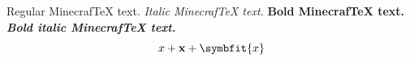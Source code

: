 \documentclass{article}
\begin{document}
Regular MinecrafTeX text.
\textit{Italic MinecrafTeX text.}
\textbf{Bold MinecrafTeX text.}
\textbf{\textit{Bold italic MinecrafTeX text.}}
\[
  x + \mathbf{x} + \symbfit{x}
\]
\end{document}
